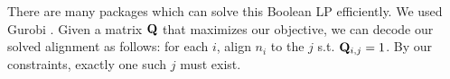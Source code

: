 %
%
%
%
%

There are many packages which can solve this Boolean LP efficiently.
We used Gurobi \cite{gurobi}.
Given a matrix $\mathbf{Q}$ that maximizes our objective, we can decode our solved alignment 
  as follows: for each $i$, align $n_i$ to the $j$ s.t. $\mathbf{Q}_{i,j} = 1$. 
By our constraints, exactly one such $j$ must exist.
